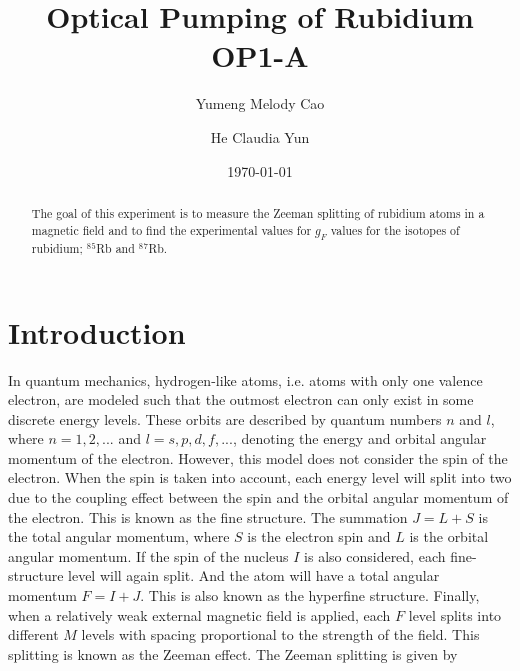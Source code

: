\documentclass[prb,preprint]{revtex4-1}
\begin{document}
\title{Optical Pumping of Rubidium OP1-A}

\author{Yumeng Melody Cao}
\author{He Claudia Yun}


\date{\today}


\begin{abstract}
The goal of this experiment is to measure the Zeeman splitting of rubidium atoms in a magnetic field and to find the experimental values for $g_F$ values for the isotopes of rubidium; $^8$$^5$Rb and $^8$$^7$Rb.\\

\end{abstract}

\maketitle 

\section{Introduction}


In quantum mechanics, hydrogen-like atoms, i.e. atoms with only one valence electron, are modeled such that the outmost electron can only exist in some discrete energy levels. These orbits are described by quantum numbers $n$ and $l$, where $n=1, 2, ...$ and $l=s, p, d, f, ...$, denoting the energy and orbital angular momentum of the electron. However, this model does not consider the spin of the electron. When the spin is taken into account, each energy level will split into two due to the coupling effect between the spin and the orbital angular momentum of the electron. This is known as the fine structure. The summation $J=L+S$ is the total angular momentum, where $S$ is the electron spin and $L$ is the orbital angular momentum. If the spin of the nucleus $I$ is also considered, each fine-structure level will again split. And the atom will have a total angular momentum $F=I+J$. This is also known as the hyperfine structure. Finally, when a relatively weak external magnetic field is applied, each $F$ level splits into different $M$ levels with spacing proportional to the strength of the field. This splitting is known as the Zeeman effect. The Zeeman splitting is given by
\end{document}
